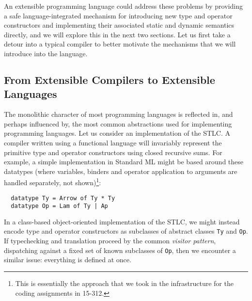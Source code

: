 An extensible programming language could address these problems by providing a safe language-integrated mechanism for introducing new type and operator constructors and implementing their associated static and dynamic semantics directly, and we will explore this in the next two sections. Let us first take a detour into a typical compiler to better motivate the mechanisms that we will introduce into the language.

\subsection{From Extensible Compilers to Extensible Languages}\label{evolution}
The monolithic character of most programming languages is reflected in, and perhaps influenced by, the most common abstractions used for implementing programming languages.
Let us consider an implementation of the STLC. 
A compiler written using a functional language will invariably represent the primitive type  and operator constructors using {closed} recursive sums. 
For example, a simple implementation in Standard ML might be based around these datatypes (where variables, binders and operator application to arguments are handled separately, not shown)\footnote{This is essentially the approach that we took in the infrastructure for the coding assignments in 15-312.}:
\begin{lstlisting}
  datatype Ty = Arrow of Ty * Ty
  datatype Op = Lam of Ty | Ap 
\end{lstlisting}


In a class-based object-oriented implementation of the STLC, we might instead encode type and operator constructors as subclasses of abstract classes \verb|Ty| and \verb|Op|. If typechecking and translation proceed by the common \emph{visitor pattern}, dispatching against a fixed set of {known} subclasses of \verb|Op|, then we encounter a similar issue: everything is defined at once. 

